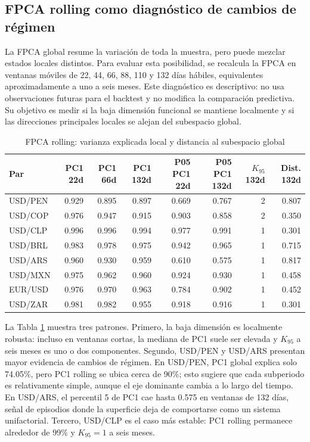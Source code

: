 \documentclass[a4paper,11pt]{article}
\begin{document}
\subsection{FPCA rolling como diagnóstico de cambios de régimen}

La FPCA global resume la variación de toda la muestra, pero puede mezclar estados locales distintos. Para evaluar esta posibilidad, se recalcula la FPCA en ventanas móviles de 22, 44, 66, 88, 110 y 132 días hábiles, equivalentes aproximadamente a uno a seis meses. Este diagnóstico es descriptivo: no usa observaciones futuras para el backtest y no modifica la comparación predictiva. Su objetivo es medir si la baja dimensión funcional se mantiene localmente y si las direcciones principales locales se alejan del subespacio global.

\begin{table}[H]
\centering
\caption{FPCA rolling: varianza explicada local y distancia al subespacio global}
\label{tab:rolling_fpca}
\scriptsize
\begin{tabular}{lrrrrrrr}
\toprule
Par & PC1 22d & PC1 66d & PC1 132d & P05 PC1 22d & P05 PC1 132d & \(K_{95}\) 132d & Dist. 132d \\
\midrule
USD/PEN & 0.929 & 0.895 & 0.897 & 0.669 & 0.767 & 2 & 0.807 \\
USD/COP & 0.976 & 0.947 & 0.915 & 0.903 & 0.858 & 2 & 0.350 \\
USD/CLP & 0.996 & 0.996 & 0.994 & 0.977 & 0.991 & 1 & 0.301 \\
USD/BRL & 0.983 & 0.978 & 0.975 & 0.942 & 0.965 & 1 & 0.715 \\
USD/ARS & 0.960 & 0.930 & 0.959 & 0.610 & 0.575 & 1 & 0.817 \\
USD/MXN & 0.975 & 0.962 & 0.960 & 0.924 & 0.930 & 1 & 0.458 \\
EUR/USD & 0.976 & 0.970 & 0.963 & 0.784 & 0.902 & 1 & 0.452 \\
USD/ZAR & 0.981 & 0.982 & 0.955 & 0.918 & 0.916 & 1 & 0.301 \\
\bottomrule
\end{tabular}
\end{table}

La Tabla \ref{tab:rolling_fpca} muestra tres patrones. Primero, la baja dimensión es localmente robusta: incluso en ventanas cortas, la mediana de PC1 suele ser elevada y \(K_{95}\) a seis meses es uno o dos componentes. Segundo, USD/PEN y USD/ARS presentan mayor evidencia de cambios de régimen. En USD/PEN, PC1 global explica solo 74.05\%, pero PC1 rolling se ubica cerca de 90\%; esto sugiere que cada subperiodo es relativamente simple, aunque el eje dominante cambia a lo largo del tiempo. En USD/ARS, el percentil 5 de PC1 cae hasta 0.575 en ventanas de 132 días, señal de episodios donde la superficie deja de comportarse como un sistema unifactorial. Tercero, USD/CLP es el caso más estable: PC1 rolling permanece alrededor de 99\% y \(K_{95}=1\) a seis meses.
\end{document}
